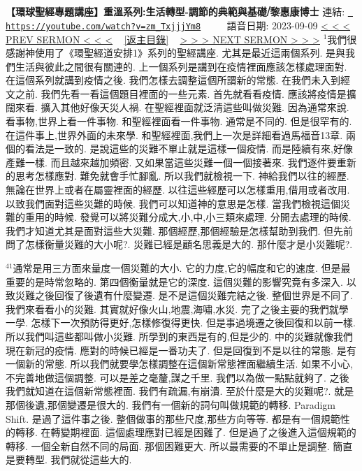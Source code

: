 \documentclass{book}
\begin{document}
\section{}
\label{sec:zm_TxjjjYm8}
\textbf{【環球聖經專題講座】重溫系列:生活轉型-調節的典範與基礎⧸黎惠康博士}
\newline
\newline
連結: \href{https://youtube.com/watch?v=zm_TxjjjYm8}{\texttt{ https://youtube.com/watch?v=zm\_TxjjjYm8}} ~~~~ 語音日期: 2023-09-09 
\newline
\newline
\hyperref[sec:PkwOeUk00co]{\small{< < < PREV SERMON < < <}}
~
\hyperref[sec:index]{\small{[返主目錄]}}
~
\hyperref[sec:I0SwLQsiJOs]{\small{> > > NEXT SERMON > > >}}
\newline
\newline
$^{1}$我們很感謝神使用了《環聖經道安排1》系列的聖經講座.
尤其是最近這兩個系列.
是與我們生活與彼此之間很有關連的.
上一個系列是講到在疫情裡面應該怎樣處理面對.
在這個系列就講到疫情之後.
我們怎樣去調整這個所謂新的常態.
在我們未入到經文之前.
我們先看一看這個題目裡面的一些元素.
首先就看看疫情.
應該將疫情是擴闊來看.
擴入其他好像天災人禍.
在聖經裡面就泛清這些叫做災難.
因為通常來說.
看事物,世界上看一件事物.
和聖經裡面看一件事物.
通常是不同的.
但是很罕有的.
在這件事上,世界外面的未來學.
和聖經裡面,我們上一次是詳細看過馬福音13章.
兩個的看法是一致的.
是說這些的災難不單止就是這樣一個疫情.
而是陸續有來,好像產難一樣.
而且越來越加頻密.
又如果當這些災難一個一個接著來.
我們逐件要重新的思考怎樣應對.
難免就會手忙腳亂.
所以我們就檢視一下.
神給我們以往的經歷.
無論在世界上或者在屬靈裡面的經歷.
以往這些經歷可以怎樣重用,借用或者改用.
以致我們面對這些災難的時候.
我們可以知道神的意思是怎樣.
當我們檢視這個災難的重用的時候.
發覺可以將災難分成大,小,中,小三類來處理.
分開去處理的時候.
我們才知道尤其是面對這些大災難.
那個經歷,那個經驗是怎樣幫助到我們.
但先前問了怎樣衡量災難的大小呢?.
災難已經是顧名思義是大的.
那什麼才是小災難呢?.

$^{41}$通常是用三方面來量度一個災難的大小.
它的力度,它的幅度和它的速度.
但是最重要的是時常忽略的.
第四個衡量就是它的深度.
這個災難的影響究竟有多深入.
以致災難之後回復了後遺有什麼變遷.
是不是這個災難完結之後.
整個世界是不同了.
我們來看看小的災難.
其實就好像火山,地震,海嘯,水災.
完了之後主要的我們就學一學.
怎樣下一次預防得更好,怎樣修復得更快.
但是事過境遷之後回復和以前一樣.
所以我們叫這些都叫做小災難.
所學到的東西是有的,但是少的.
中的災難就像我們現在新冠的疫情.
應對的時候已經是一番功夫了.
但是回復到不是以往的常態.
是有一個新的常態.
所以我們就要學怎樣調整在這個新常態裡面繼續生活.
如果不小心,不完善地做這個調整.
可以是差之毫釐,謀之千里.
我們以為做一點點就夠了.
之後我們就知道在這個新常態裡面.
我們有疏漏,有崩潰.
至於什麼是大的災難呢?.
就是那個後遺,那個變遷是很大的.
我們有一個新的詞句叫做規範的轉移.
Paradigm Shift.
是過了這件事之後.
整個做事的那些尺度,那些方向等等.
都是有一個規範性的轉移.
在轉變期裡面.
這個處理應對已經是困難了.
但是過了之後進入這個規範的轉移.
一個全新自然不同的局面.
那個困難更大.
所以最需要的不單止是調整.
簡直是要轉型.
我們就從這些大的.
\end{document}
